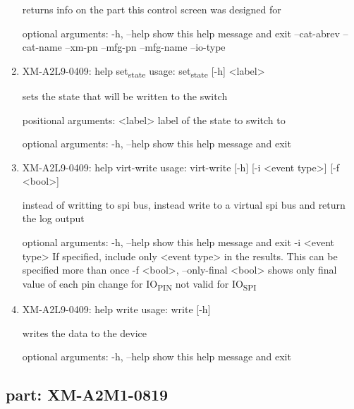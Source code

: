 \documentclass[11pt]{article}
\begin{document}
\begin{enumerate}
returns info on the part this control screen was designed for

optional arguments:
  -h, --help   show this help message and exit
  --cat-abrev
  --cat-name
  --xm-pn
  --mfg-pn
  --mfg-name
  --io-type

\item XM-A2L9-0409: help set\textsubscript{state}
\label{sec:orgeeea2bf}
usage: set\textsubscript{state} [-h] <label>

sets the state that will be written to the switch

positional arguments:
  <label>     label of the state to switch to

optional arguments:
  -h, --help  show this help message and exit

\item XM-A2L9-0409: help virt-write
\label{sec:org25d7047}
usage: virt-write [-h] [-i <event type>] [-f <bool>]

instead of writting to spi bus, instead write to a virtual spi bus and return
the log output

optional arguments:
  -h, --help            show this help message and exit
  -i <event type>       If specified, include only <event type> in the
                        results. This can be specified more than once
  -f <bool>, --only-final <bool>
                        shows only final value of each pin change for IO\textsubscript{PIN}
                        not valid for IO\textsubscript{SPI}

\item XM-A2L9-0409: help write
\label{sec:org4ec2dd2}
usage: write [-h]

writes the data to the device

optional arguments:
  -h, --help  show this help message and exit
\end{enumerate}

\subsection{part: XM-A2M1-0819}
\label{sec:orgd0389c7}
\end{document}
